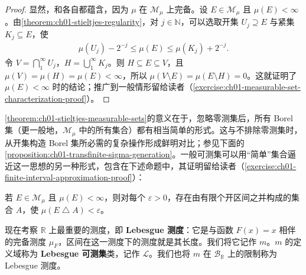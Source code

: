 \documentclass[../../main.tex]{subfiles}%
\begin{document}
\begin{proof}
显然，和各自都蕴含，因为 $\mu$ 在 $\mathscr{M}_\mu$ 上完备。设 $E\in\mathscr{M}_\mu$ 且 $\mu(E)<\infty$。由\cref{theorem:ch01-stieltjes-regularity}，对 $j\in\mathbb{N}$，可以选取开集 $U_j\supseteq E$ 与紧集 $K_j\subseteq E$，使
\begin{align*}
\mu(U_j)-2^{-j}\leqslant\mu(E)\leqslant\mu(K_j)+2^{-j}.
\end{align*}
令 $V=\bigcap_1^\infty U_j$，$H=\bigcup_1^\infty K_j$。则 $H\subseteq E\subseteq V$，且 $\mu(V)=\mu(H)=\mu(E)<\infty$，所以 $\mu(V\setminus E)=\mu(E\setminus H)=0$。这就证明了 $\mu(E)<\infty$ 时的结论；推广到一般情形留给读者（\cref{exercise:ch01-measurable-set-characterization-proof}）。
\end{proof}

\cref{theorem:ch01-stieltjes-measurable-sets}的意义在于，忽略零测集后，所有 Borel 集（更一般地，$\mathscr{M}_\mu$ 中的所有集合）都有相当简单的形式。这与不排除零测集时，从开集构造 Borel 集所必需的复杂操作形成鲜明对比；参见下面的\cref{proposition:ch01-transfinite-sigma-generation}。一般可测集可以用“简单”集合逼近这一思想的另一种形式，包含在下述命题中，其证明留给读者（\cref{exercise:ch01-finite-interval-approximation-proof}）：

\begin{proposition}\label{proposition:ch01-finite-interval-approximation}
若 $E\in\mathscr{M}_\mu$ 且 $\mu(E)<\infty$，则对每个 $\varepsilon>0$，存在由有限个开区间之并构成的集合 $A$，使 $\mu(E\mathbin{\triangle}A)<\varepsilon$。
\end{proposition}


\begin{definition}\label{definition:ch01-lebesgue-measure-definition}
现在考察 $\mathbb{R}$ 上最重要的测度，即 \textbf{Lebesgue 测度}：它是与函数 $F(x)=x$ 相伴的完备测度 $\mu_F$，区间在这一测度下的测度就是其长度。我们将它记作 $m$。$m$ 的定义域称为 \textbf{Lebesgue 可测集}类，记作 $\mathscr{L}$。我们也将 $m$ 在 $\mathscr{B}_{\mathbb{R}}$ 上的限制称为 Lebesgue 测度。
\end{definition}
\end{document}
